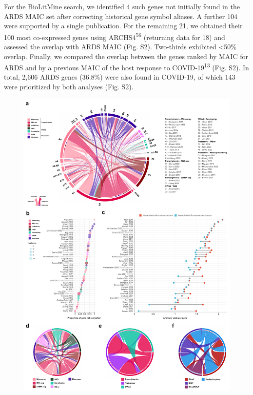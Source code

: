 \documentclass[
  11,
  a4paper,
]{article}
\begin{document}
For the BioLitMine search, we identified 4 such genes not initially
found in the ARDS MAIC set after correcting historical gene symbol
aliases. A further 104 were supported by a single publication. For the
remaining 21, we obtained their 100 most co-expressed genes using
ARCHS4\textsuperscript{56} (returning data for 18) and assessed the
overlap with ARDS MAIC (Fig. S2). Two-thirds exhibited \textless50\%
overlap. Finally, we compared the overlap between the genes ranked by
MAIC for ARDS and by a previous MAIC of the host response to
COVID-19\textsuperscript{13} (Fig. S2). In total, 2,606 ARDS genes
(36.8\%) were also found in COVID-19, of which 143 were prioritized by
both analyses (Fig. S2).

\begin{figure}

{\centering \includegraphics{./img/Figure_2.png}

}
\end{figure}
\end{document}
